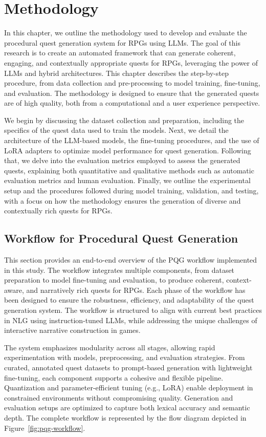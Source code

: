\clearpage

\chapter{Methodology}

In this chapter, we outline the methodology used to develop and evaluate the procedural
quest generation system for RPGs using LLMs. The goal of this research is to create an
automated framework that can generate coherent, engaging, and contextually appropriate
quests for RPGs, leveraging the power of LLMs and hybrid architectures. This chapter
describes the step-by-step procedure, from data collection and pre-processing to model
training, fine-tuning, and evaluation. The methodology is designed to ensure that the
generated quests are of high quality, both from a computational and a user experience
perspective.

We begin by discussing the dataset collection and preparation, including the specifics
of the quest data used to train the models. Next, we detail the architecture of the LLM-based
models, the fine-tuning procedures, and the use of LoRA adapters to optimize model
performance for quest generation. Following that, we delve into the evaluation metrics
employed to assess the generated quests, explaining both quantitative and qualitative
methods such as automatic evaluation metrics and human evaluation. Finally, we outline
the experimental setup and the procedures followed during model training, validation,
and testing, with a focus on how the methodology ensures the generation of diverse and
contextually rich quests for RPGs.

\section{Workflow for Procedural Quest Generation}

This section provides an end-to-end overview of the PQG workflow implemented in this
study. The workflow integrates multiple components, from dataset preparation to model
fine-tuning and evaluation, to produce coherent, context-aware, and narratively rich quests
for RPGs. Each phase of the workflow has been designed to ensure the robustness,
efficiency, and adaptability of the quest generation system. The workflow is structured to
align with current best practices in NLG using instruction-tuned LLMs, while addressing
the unique challenges of interactive narrative construction in games.

The system emphasizes modularity across all stages, allowing rapid experimentation
with models, preprocessing, and evaluation strategies. From curated, annotated quest
datasets to prompt-based generation with lightweight fine-tuning, each component supports
a cohesive and flexible pipeline. Quantization and parameter-efficient tuning (e.g.,
LoRA) enable deployment in constrained environments without compromising quality.
Generation and evaluation setups are optimized to capture both lexical accuracy and
semantic depth. The complete workflow is represented by the flow diagram depicted in Figure~\ref{fig:pqg-workflow}.


